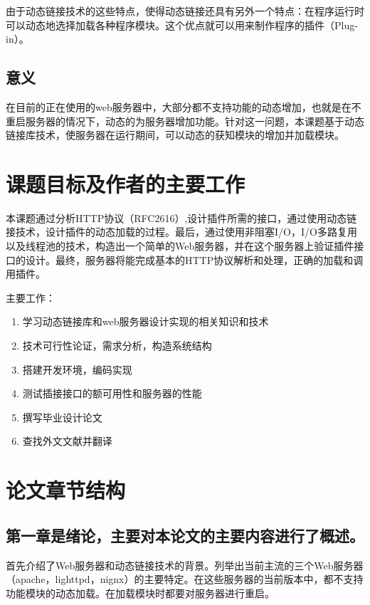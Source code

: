 \documentclass[12pt, twoside, a4paper, xetex]{report}
\begin{document}
	由于动态链接技术的这些特点，使得动态链接还具有另外一个特点：在程序运行时可以动态地选择加载各种程序模块。这个优点就可以用来制作程序的插件（Plug-in）。
\subsection{意义}
	在目前的正在使用的web服务器中，大部分都不支持功能的动态增加，也就是在不重启服务器的情况下，动态的为服务器增加功能。针对这一问题，本课题基于动态链接库技术，使服务器在运行期间，可以动态的获知模块的增加并加载模块。
	
\section{课题目标及作者的主要工作}
	本课题通过分析HTTP协议（RFC2616）,设计插件所需的接口，通过使用动态链接技术，设计插件的动态加载的过程。最后，通过使用非阻塞I/O，I/O多路复用以及线程池的技术，构造出一个简单的Web服务器，并在这个服务器上验证插件接口的设计。最终，服务器将能完成基本的HTTP协议解析和处理，正确的加载和调用插件。
	
	\vspace{12pt}
	主要工作：
	\begin{enumerate}
		\item 学习动态链接库和web服务器设计实现的相关知识和技术                                
		\item 技术可行性论证，需求分析，构造系统结构                                            
		\item 搭建开发环境，编码实现 
		\item 测试插接接口的额可用性和服务器的性能                                                                                              
		\item 撰写毕业设计论文                                                                  
		\item 查找外文文献并翻译 
	\end{enumerate}
	
\section{论文章节结构}
	\subsection*{第一章是绪论，主要对本论文的主要内容进行了概述。}
	
	首先介绍了Web服务器和动态链接技术的背景。列举出当前主流的三个Web服务器（apache，lighttpd，nignx）的主要特定。在这些服务器的当前版本中，都不支持功能模块的动态加载。在加载模块时都要对服务器进行重启。
	
\end{document}
